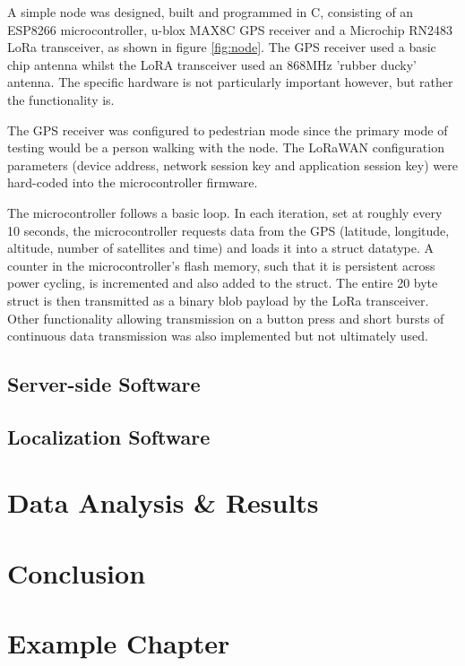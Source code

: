 \documentclass[a4paper]{report}
\begin{document}
    A simple node was designed, built and programmed in C, consisting of an ESP8266 microcontroller, u-blox MAX8C GPS receiver and a Microchip RN2483 LoRa transceiver, as shown in figure \ref{fig:node}. The GPS receiver used a basic chip antenna whilst the LoRA transceiver used an 868MHz 'rubber ducky' antenna. The specific hardware is not particularly important however, but rather the functionality is.

    The GPS receiver was configured to pedestrian mode since the primary mode of testing would be a person walking with the node. The LoRaWAN configuration parameters (device address, network session key and application session key) were hard-coded into the microcontroller firmware.

    The microcontroller follows a basic loop. In each iteration, set at roughly every 10 seconds, the microcontroller requests data from the GPS (latitude, longitude, altitude, number of satellites and time) and loads it into a struct datatype. A counter in the microcontroller's flash memory, such that it is persistent across power cycling, is incremented and also added to the struct. The entire 20 byte struct is then transmitted as a binary blob payload by the LoRa transceiver. Other functionality allowing transmission on a button press and short bursts of continuous data transmission was also implemented but not ultimately used.



  \section{Server-side Software}

  \section{Localization Software}

\chapter{Data Analysis \& Results}

\chapter{Conclusion}




\chapter{Example Chapter}
\end{document}
